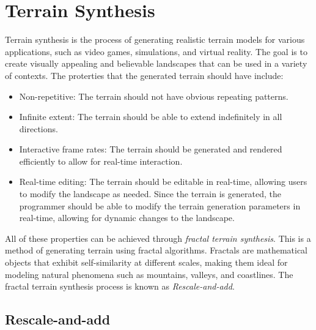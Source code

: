 \chapter{Terrain Synthesis}

Terrain synthesis is the process of generating realistic terrain models for various applications, such as video games, simulations, and virtual reality. The goal is to create visually appealing and believable landscapes that can be used in a variety of contexts. The proterties that the generated terrain should have include:
\begin{itemize}
    \item Non-repetitive: The terrain should not have obvious repeating patterns.
    \item Infinite extent: The terrain should be able to extend indefinitely in all directions.
    \item Interactive frame rates: The terrain should be generated and rendered efficiently to allow for real-time interaction.
    \item Real-time editing: The terrain should be editable in real-time, allowing users to modify the landscape as needed. Since the terrain is generated, the programmer should be able to modify the terrain generation parameters in real-time, allowing for dynamic changes to the landscape.
\end{itemize}

All of these properties can be achieved through \emph{fractal terrain synthesis}. This is a method of generating terrain using fractal algorithms. Fractals are mathematical objects that exhibit self-similarity at different scales, making them ideal for modeling natural phenomena such as mountains, valleys, and coastlines. The fractal terrain synthesis process is known as \emph{Rescale-and-add}.

\section{Rescale-and-add}

